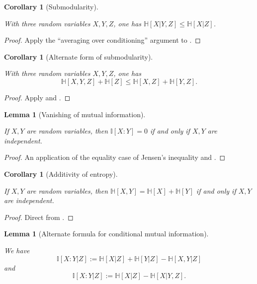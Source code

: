 \documentclass[10pt,a4paper]{article}
\newtheorem{lemma}[theorem]{Lemma}
\newtheorem{corollary}[theorem]{Corollary}
\newcommand{\lean}[1]{}
\newcommand{\uses}[1]{}
\newcommand{\leanok}{}
\newcommand{\bbH}{\mathbb{H}}
\newcommand{\bbI}{\mathbb{I}}
\begin{document}
\begin{corollary}[Submodularity]\label{submodularity}
  \lean{ProbabilityTheory.entropy_submodular, ProbabilityTheory.condEntropy_comp_ge}\leanok
  With three random variables $X,Y,Z$, one has $\bbH[X|Y,Z] \leq \bbH[X|Z]$.
\end{corollary}

\begin{proof} \uses{cond-reduce}\leanok Apply the ``averaging over conditioning'' argument to .
\end{proof}

\begin{corollary}[Alternate form of submodularity]\label{alt-submodularity}
  \lean{ProbabilityTheory.entropy_triple_add_entropy_le}\leanok
  With three random variables $X,Y,Z$, one has
  $$ \bbH[X,Y,Z] + \bbH[Z] \leq \bbH[X,Z] + \bbH[Y,Z].$$
\end{corollary}

\begin{proof}  \uses{submodularity,chain-rule} \leanok Apply  and .
\end{proof}


\begin{lemma}[Vanishing of mutual information]
  \label{vanish-entropy}
  \uses{information-def, independent-def}
  \lean{ProbabilityTheory.mutualInfo_eq_zero}
  \leanok
  If $X,Y$ are random variables, then $\bbI[X:Y] = 0$ if and only if $X,Y$ are independent.
  \end{lemma}

  \begin{proof}
    \uses{concave}
    \leanok

    An application of the equality case of Jensen's inequality and .
  \end{proof}

\begin{corollary}[Additivity of entropy]\label{add-entropy}
  \lean{ProbabilityTheory.entropy_pair_eq_add}
  \leanok
  If $X,Y$ are random variables, then $\bbH[X,Y] = \bbH[X] + \bbH[Y]$ if and only if $X,Y$ are independent.
\end{corollary}

\begin{proof} \uses{vanish-entropy}\leanok
  Direct from .
\end{proof}


\begin{lemma}[Alternate formula for conditional mutual information]
  \label{conditional-mutual-alt}
  \uses{conditional-mutual-def}
  \lean{ProbabilityTheory.condMutualInfo_eq, ProbabilityTheory.condMutualInfo_eq'}\leanok
We have
  $$ \bbI[X:Y|Z] := \bbH[X|Z] + \bbH[Y|Z] - \bbH[X,Y|Z]$$
and
  $$ \bbI[X:Y|Z] := \bbH[X|Z] - \bbH[X|Y,Z].$$
\end{lemma}
\end{document}
